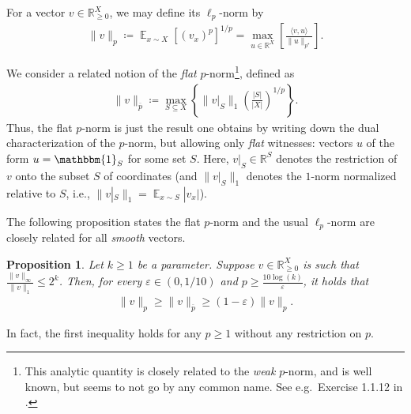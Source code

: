 \documentclass[11pt]{article}
\newtheorem{prop}[theorem]{Proposition}
\DeclareMathOperator*{\E}{\mathbb{E}}
\newcommand{\1}{ \mathbbm{1}}
\newcommand{\eps}{\varepsilon}
\begin{document}
For a vector $v\in \mathbb{R}_{\ge 0}^{X}$, we may define its $\ell_p$-norm by
\begin{align}
\| v \|_{p} \coloneqq \E_{x\sim X} [(v_x)^p ]^{1/p} = \max_{u\in \mathbb{R}^X}\left[ \frac{\langle v, u \rangle}{\|u\|_{p^\star}} \right]. \label{equ: def vector norm}
\end{align}

We consider a related notion of the \emph{flat} $p$-norm\footnote{
This analytic quantity is closely related to the \emph{weak} $p$-norm, and is well known, but seems to not go by any common name. See e.g.\ Exercise 1.1.12 in \cite{grafakos2008classical}.
}, defined as
\begin{align}
\|v\|_{\overline{p}} \coloneqq \max_{S\subseteq X} \left\{ \| v|_S \|_1 \left( \frac{|S|}{|X|} \right)^{1/p} \right\}. \label{equ:def vector flat norm}
\end{align}
Thus, the flat $p$-norm is just the result one obtains by writing down the dual characterization of the $p$-norm, but allowing only \emph{flat} witnesses: vectors $u$ of the form $u = \1_{S}$ for some set $S$. 
Here, $v|_S\in \mathbb{R}^S$ denotes the restriction of $v$ onto the subset $S$ of coordinates (and $\| v|_S \|_1$ denotes the $1$-norm normalized relative to $S$, i.e.,  $\| v|_S \|_1 = \E_{x \sim S} |v_{x}|$).

The following proposition states the flat $p$-norm and the usual $\ell_p$-norm are closely related for all \emph{smooth} vectors.
\begin{prop}\label{prop:vector norm vs flat norm}
    Let $k\ge 1$ be a parameter. Suppose $v\in \mathbb{R}_{\ge 0}^{X}$ is such that $\frac{\|v\|_{\infty}}{\|v\|_{1}}\le 2^k$. Then, for every $\eps \in (0, 1/10)$ and $p\ge \frac{10 \log(k)}{\eps}$, it holds that
    \begin{align}
        \|v\|_{p} \ge \| v \|_{\overline{p}} \ge (1-\eps) \| v \|_p.
    \end{align}
\end{prop}

In fact, the first inequality holds for any $p\ge 1$ without any restriction on $p$.
\end{document}
